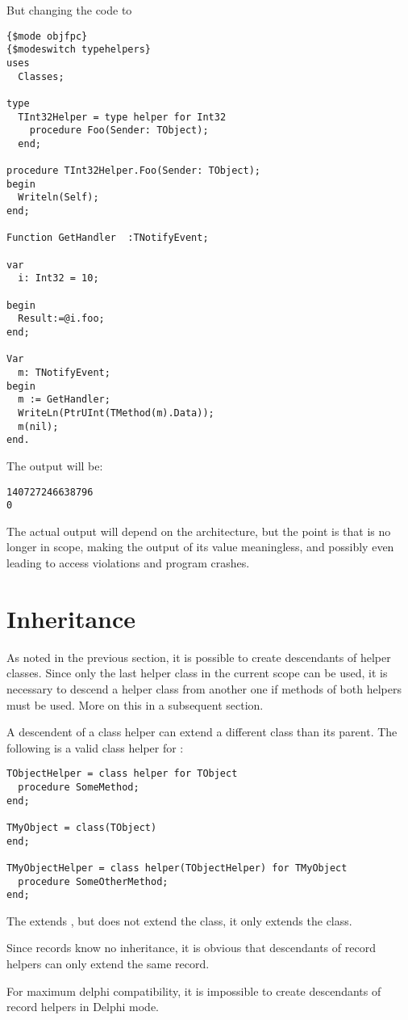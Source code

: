 But changing the code to
\begin{verbatim}
{$mode objfpc}
{$modeswitch typehelpers}
uses
  Classes;

type
  TInt32Helper = type helper for Int32
    procedure Foo(Sender: TObject);
  end;

procedure TInt32Helper.Foo(Sender: TObject);
begin
  Writeln(Self);
end;

Function GetHandler  :TNotifyEvent;

var
  i: Int32 = 10;

begin
  Result:=@i.foo;
end;

Var
  m: TNotifyEvent;
begin
  m := GetHandler;
  WriteLn(PtrUInt(TMethod(m).Data));
  m(nil);
end.
\end{verbatim}
The output will be:
\begin{verbatim}
140727246638796
0
\end{verbatim}
The actual output will depend on the architecture, but the point is that  is no longer in scope,
making the output of its value meaningless, and possibly even leading to access violations and program crashes.

\section{Inheritance}
As noted in the previous section, it is possible to create descendants of
helper classes. Since only the last helper class in the current scope can
be used, it is necessary to descend a helper class from another one if
methods of both helpers must be used. More on this in a subsequent section.

A descendent of a class helper can extend a different class than its
parent. The following is a valid class helper for :
\begin{verbatim}
TObjectHelper = class helper for TObject
  procedure SomeMethod;
end;

TMyObject = class(TObject)
end;

TMyObjectHelper = class helper(TObjectHelper) for TMyObject
  procedure SomeOtherMethod;
end;
\end{verbatim}
The  extends , but does not extend
the  class, it only extends the  class.

Since records know no inheritance, it is obvious that descendants of record
helpers can only extend the same record.

\begin{remark}
For maximum delphi compatibility, it is impossible to create descendants of record helpers
in Delphi mode.
\end{remark}

